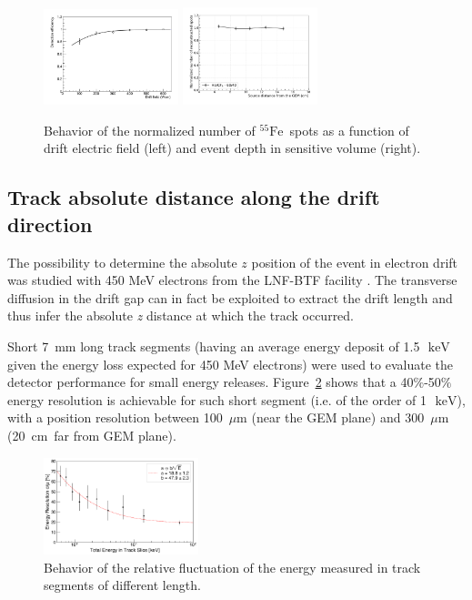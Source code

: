\documentclass[physics,article,submit,moreauthors,pdftex]{Definitions/mdpi}
\newcommand{\fe}{\ensuremath{^{55}\textrm{Fe}}\xspace}
\newcommand{\keV}{\ensuremath{\,\textrm{keV}}\xspace}
\begin{document}
\begin{figure}[t!]
\centering
\includegraphics[width=0.35\textwidth]{gEff_Edrift.pdf}
\includegraphics[width=0.35\textwidth]{feZscan6040_wo_4.pdf}
\caption{Behavior of the normalized number of \fe~spots as a function of drift electric field (left) and event depth in sensitive volume (right).} 
\label{fig:deteff}
\end{figure}


\subsection{Track absolute distance along the drift direction}\label{sec:track}
The possibility to determine the absolute $z$ position of the event in electron drift was studied with 450 MeV electrons from the LNF-BTF facility \cite{bib:lemon_btf}. The  transverse diffusion in the drift gap can in fact be exploited to extract the drift length and thus infer the absolute {\it z} distance at which the track occurred. 

Short 7~mm long track segments (having an average energy deposit of 1.5~\keV given the energy loss expected for 450 MeV electrons) were used to evaluate the detector performance for small energy releases. Figure~\ref{fig:eres} shows that a 40$\%$-50$\%$ energy resolution is achievable for such short segment (i.e. of the order of 1~\keV), with a position resolution between 100~$\mu$m (near the GEM plane) and 300~$\mu$m (20~cm~far from GEM plane).

\begin{figure}[t!]
\centering
\includegraphics[width=0.40\textwidth]{EResBTF.pdf}
\caption{Behavior of the relative fluctuation of the energy measured in track segments of different length.} 
\label{fig:eres}
\end{figure}
\end{document}
